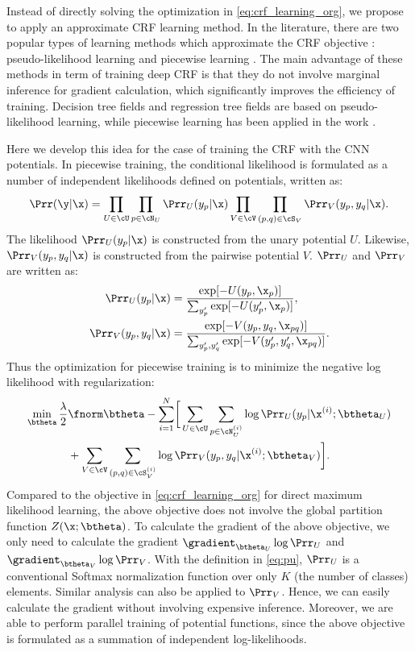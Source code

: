 Instead of directly solving the optimization in \eqref{eq:crf_learning_org},
we propose to apply an approximate CRF learning method.
In the literature,
there are two popular types of learning methods which approximate the CRF objective
: pseudo-likelihood learning \cite{besag1977efficiency} and piecewise learning \cite{SuttonM05}.
The main advantage of these methods  in term of training deep CRF is that they  do not involve marginal inference for gradient calculation,
which significantly improves the efficiency of training.
Decision tree fields \cite{NowozinRBSYK11} and regression tree fields \cite{jancsary2012regression}
are based on pseudo-likelihood learning, while
piecewise learning has been applied in the work \cite{SuttonM05,kolesnikov2014closed}.

Here we develop this idea for the case of training the CRF with the CNN potentials.
In piecewise training, 
the conditional likelihood 
is formulated as a number of independent likelihoods defined on potentials, written as:
\begin{align}
\Prr (\y | \x) = \prod_{U \in \cU} \prod_{ p \in \cN_{U}} \Prr_{U} ( y_p | \x) \prod_{V \in \cV}
\prod_{ (p,q) \in \cS_{V}} \Prr_{V} ( y_p, y_q | \x). \notag
\end{align}
The likelihood $\Prr_{U} ( y_p | \x)$ is constructed from the unary potential $U$.
Likewise, $\Prr_{V} ( y_p, y_q | \x)$ is constructed from the pairwise potential $V$.
$\Prr_{U}$ and $\Prr_{V}$ are written as:
\begin{align}
\Prr_{U}(y_p|\x) &  = \frac{\exp [- U(y_p, \x_p)]}{\sum_{y'_p} \exp [ -U(y'_p, \x_p) ]}, \label{eq:pu} \\
\Prr_{V}(y_p, y_q|\x) &  = \frac{\exp [- V(y_p, y_q, \x_{pq})]}{\sum_{y'_p, y'_q} \exp [ -V(y'_p, y'_q, \x_{pq}) ]}
\label{eq:pv}.
\end{align}
 Thus the optimization for piecewise training is to minimize
 the negative log likelihood with regularization:
\begin{align}
	\min_{\btheta} \frac{\lambda}{2} & \fnorm \btheta -
	 \sum_{i=1}^N \biggr[ \sum_{U \in \cU}
		\sum_{ p \in \cN_{U}^{(i)}} \log \Prr_{U} ( y_p | \x^{(i)}; \btheta_U) \notag \\
	& + \sum_{V \in \cV} \sum_{ (p,q) \in \cS_{V}^{(i)}} \log \Prr_{V} ( y_p, y_q | \x^{(i)}; \btheta_V) \biggr].
	\label{eq:partitioned}
\end{align}
Compared to the objective in \eqref{eq:crf_learning_org} for direct maximum likelihood learning,
the above objective does not involve the global partition function $Z(\x ; \btheta)$.
To calculate the gradient of the above objective,
we only need to calculate the gradient
$\gradient_{\btheta_U} \log \Prr_{U}$
and
$\gradient_{\btheta_V} \log \Prr_{V}$.
With the definition in \eqref{eq:pu}, $\Prr_{U}$ is a conventional Softmax normalization function over only $K$ (the number of classes) elements. 
Similar analysis can also be applied to $\Prr_{V}$.
Hence, we can easily calculate the gradient without involving expensive inference.
Moreover, we are able to perform parallel training of potential functions, since the above objective is formulated as a summation of independent log-likelihoods.

